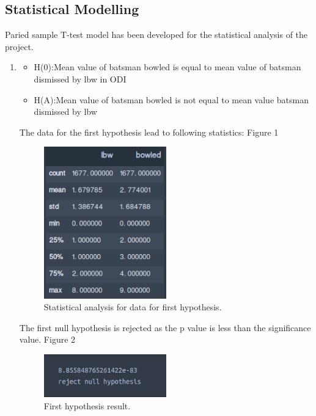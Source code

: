 \documentclass[fleqn,10pt]{wlscirep}
\begin{document}
\subsection{Statistical Modelling}
Paried sample T-test model has been developed for the statistical analysis of the project. 
\begin{enumerate}
\item
\begin{itemize}
\item H(0):Mean value of batsman bowled is equal to mean value of batsman dismissed by lbw in ODI
\item H(A):Mean value of batsman bowled is not equal to mean value batsman dismissed by lbw
\end{itemize}

The data for the first hypothesis lead to following statistics: Figure 1
\begin{figure}[h!]
    \centering
    \includegraphics[width=0.5\textwidth]{lbwbowled.png}
    \caption{Statistical analysis for data for first hypothesis.}
  \end{figure}

  The first null hypothesis is rejected as the p value is less than the significance value. Figure 2
  \begin{figure}[h!]
      \centering
      \includegraphics[width=0.5\textwidth]{lbwbowledhypo.png}
      \caption{First hypothesis result.}
    \end{figure}



\end{enumerate}
\end{document}
